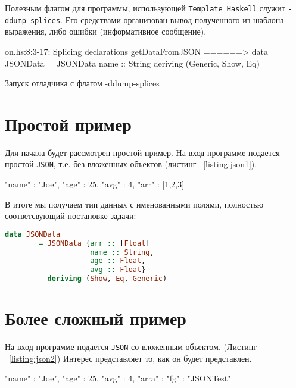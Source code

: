Полезным флагом для программы, использующей \lstinline{Template Haskell} служит \lstinline{-ddump-splices}. Его средствами организован вывод полученного из шаблона выражения, либо ошибки (информативное сообщение).

\begin{ListingEnv}[H]
\begin{Verb}
on.hs:8:3-17: Splicing declarations
    getDataFromJSON
  ======>
    data JSONData
      = JSONData {name :: String}
      deriving (Generic, Show, Eq)
\end{Verb}
\caption{Запуск отладчика с флагом -ddump-splices}
\end{ListingEnv}

\section{Простой пример}
Для начала будет рассмотрен простой пример. На вход программе подается простой \lstinline{JSON}, т.е. без вложенных объектов (листинг ~\ref{listing:json1}).

\begin{ListingEnv}[H]
\begin{Verb}
{
    "name" : "Joe",
    "age" : 25,
    "avg" : 4,
    "arr" : [1,2,3]
}
\end{Verb}
\label{listing:json1}
\end{ListingEnv}

В итоге мы получаем тип данных с именованными полями, полностью соответсвующий постановке задачи:

\begin{lstlisting}[language=Haskell]
data JSONData 
        = JSONData {arr :: [Float]
                    name :: String,
                    age :: Float,
                    avg :: Float}
          deriving (Show, Eq, Generic)
\end{lstlisting}

\section{Более сложный пример}

На вход программе подается \lstinline{JSON} со вложенным объектом. (Листинг ~\ref{listing:json2})  Интерес представляет то, как он будет представлен. 

\begin{ListingEnv}[H]
\begin{Verb}
{
    "name" : "Joe",
    "age" : 25,
    "avg" : 4,
    "arra" : 
             {
                 "fg" : "JSONTest"  
             }
}
\end{Verb}
\label{listing:json2}
\end{ListingEnv}

